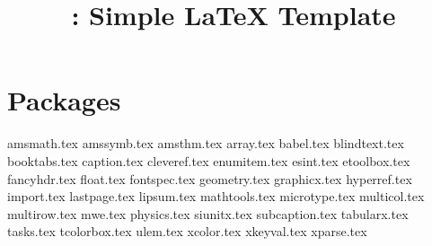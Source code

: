 \documentclass{iarticle}
\title{\ilatex: Simple \LaTeX{} Template}
\begin{document}
\tableofcontents

\section{Packages}

{amsmath.tex}
{amssymb.tex}
{amsthm.tex}
{array.tex}
{babel.tex}
{blindtext.tex}
{booktabs.tex}
{caption.tex}
{cleveref.tex}
{enumitem.tex}
{esint.tex}
{etoolbox.tex}
{fancyhdr.tex}
{float.tex}
{fontspec.tex}
{geometry.tex}
{graphicx.tex}
{hyperref.tex}
{import.tex}
{lastpage.tex}
{lipsum.tex}
{mathtools.tex}
{microtype.tex}
{multicol.tex}
{multirow.tex}
{mwe.tex}
{physics.tex}
{siunitx.tex}
{subcaption.tex}
{tabularx.tex}
{tasks.tex}
{tcolorbox.tex}
{ulem.tex}
{xcolor.tex}
{xkeyval.tex}
{xparse.tex}
\end{document}
